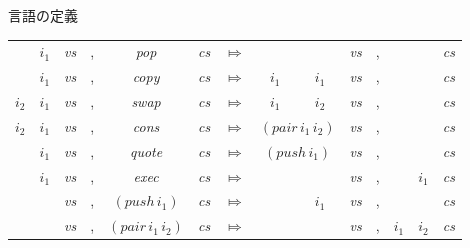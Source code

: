 \documentclass[cjk, 14pt, dvipdfm]{beamer}
\begin{document}
\begin{frame}{言語の定義}

  \footnotesize
  \begin{tabular}{cccccccccccccc}
                             & $i_1$                    & \it{vs} & , & \it{pop}                        & \it{cs} & $\Mapsto$ &
                             &                          & \it{vs} & , &                &                & \it{cs} \\
                             & $i_1$                    & \it{vs} & , & \it{copy}                       & \it{cs} & $\Mapsto$ &
    $i_1$                    & $i_1$                    & \it{vs} & , &                &                & \it{cs} \\
    $i_2$                    & $i_1$                    & \it{vs} & , & \it{swap}                       & \it{cs} & $\Mapsto$ &
    $i_1$                    & $i_2$                    & \it{vs} & , &                &                & \it{cs} \\
    $i_2$                    & $i_1$                    & \it{vs} & , & \it{cons}                       & \it{cs} & $\Mapsto$ &
    \multicolumn{2}{c}{$(\mathit{pair} \, i_1 \, i_2)$} & \it{vs} & , &                &                & \it{cs} \\
                             & $i_1$                    & \it{vs} & , & \it{quote}                      & \it{cs} & $\Mapsto$ &
    \multicolumn{2}{c}{$(\mathit{push} \, i_1)$}        & \it{vs} & , &                &                & \it{cs} \\
                             & $i_1$                    & \it{vs} & , & \it{exec}                       & \it{cs} & $\Mapsto$ &
                             &                          & \it{vs} & , &                & $i_1$          & \it{cs} \\
                             &                          & \it{vs} & , & $(\mathit{push} \, i_1)$        & \it{cs} & $\Mapsto$ &
                             & $i_1$                    & \it{vs} & , &                &                & \it{cs} \\
                             &                          & \it{vs} & , & $(\mathit{pair} \, i_1 \, i_2)$ & \it{cs} & $\Mapsto$ &
                             &                          & \it{vs} & , & $i_1$          & $i_2$          & \it{cs} \\
  \end{tabular}

\end{frame}
\end{document}
